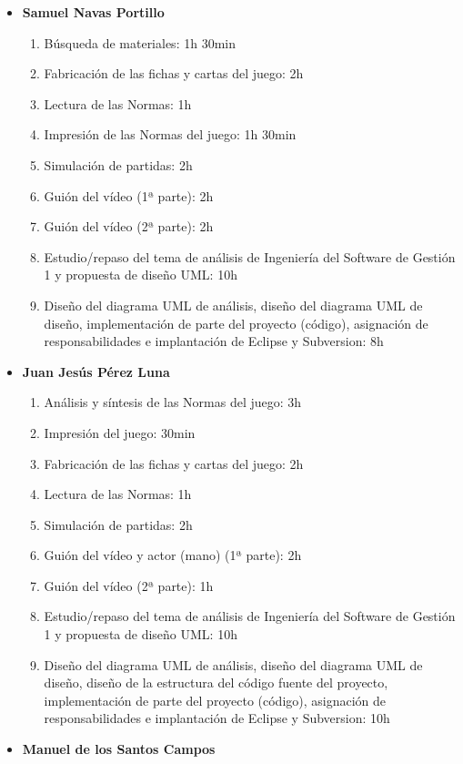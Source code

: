 \documentclass[11 pt]{book}
\begin{document}
		\begin{itemize}
			\item \textbf {Samuel Navas Portillo}
				\begin{enumerate}
					\item Búsqueda de materiales: 1h 30min
					\item Fabricación de las fichas y cartas del juego: 2h
					\item Lectura de las Normas: 1h
					\item Impresión de las Normas del juego: 1h 30min
					\item Simulación de partidas: 2h
					\item Guión del vídeo (1ª parte): 2h
					\item Guión del vídeo (2ª parte): 2h
					\item Estudio/repaso del tema de análisis de Ingeniería del Software de Gestión 1 y propuesta de diseño UML: 10h
					\item Diseño del diagrama UML de análisis, diseño del diagrama UML de diseño, implementación de parte del proyecto (código), asignación de responsabilidades e implantación de Eclipse y Subversion: 8h
				\end{enumerate}
			\item \textbf {Juan Jesús Pérez Luna}
				\begin{enumerate}
					\item Análisis y síntesis de las Normas del juego: 3h
					\item Impresión del juego: 30min
					\item Fabricación de las fichas y cartas del juego: 2h
					\item Lectura de las Normas: 1h
					\item Simulación de partidas: 2h
					\item Guión del vídeo y actor (mano) (1ª parte): 2h
					\item Guión del vídeo (2ª parte): 1h
					\item Estudio/repaso del tema de análisis de Ingeniería del Software de Gestión 1 y propuesta de diseño UML: 10h
					\item Diseño del diagrama UML de análisis, diseño del diagrama UML de diseño, diseño de la estructura del código fuente del proyecto, implementación de parte del proyecto (código), asignación de responsabilidades e implantación de Eclipse y Subversion: 10h
				\end{enumerate}
			\item \textbf {Manuel de los Santos Campos}

\end{itemize}
\end{document}
